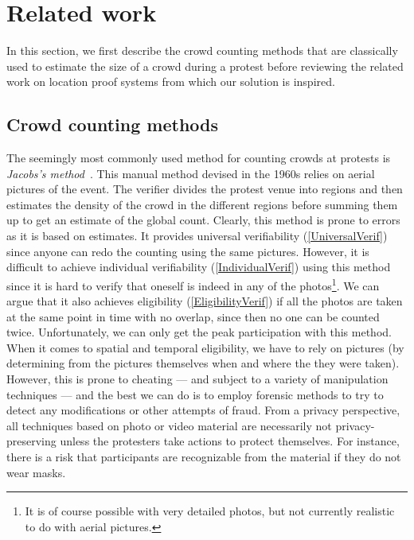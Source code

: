 \section{Related work}%
\label{RelatedWork}

In this section, we first describe the crowd counting methods that are classically used to estimate the size of a crowd during a protest before reviewing the related work on location proof systems from which our solution \PRIVO is inspired.  

\subsection{Crowd counting methods}

The seemingly most commonly used method for counting crowds at protests is \emph{Jacobs's method}~\cite{2016DemonstrationsInSeoul,BBCHowToCountProtestNumbers,HowWillWeKnowTrumpInauguralCrowdSize,TheXManMarch,TheCrowdNumbersGame}.
This manual method devised in the 1960s relies on aerial pictures of the event.
The verifier divides the protest venue into regions and then estimates the density of the crowd in the different regions before summing them up to get an estimate of the global count.
Clearly, this method is prone to errors as it is based on estimates.
It provides universal verifiability (\cref{UniversalVerif}) since anyone can redo the counting using the same pictures.
However, it is difficult to achieve individual verifiability (\cref{IndividualVerif}) using this method since it is hard to verify that oneself is indeed in any of the photos\footnote{It is of course possible with very detailed photos, but not currently realistic to do with aerial pictures.}.
We can argue that it also achieves eligibility (\cref{EligibilityVerif}) if all the photos are taken at the same point in time with no overlap, since then no one can be counted twice.
Unfortunately, we can only get the peak participation with this method.
When it comes to spatial and temporal eligibility, we have to rely on pictures (\eg by determining from the pictures themselves when and where the they were taken).
However, this is prone to cheating --- and subject to a variety of manipulation techniques --- and the best we can do is to employ forensic methods to try to detect any modifications or other attempts of fraud.
From a privacy perspective, all techniques based on photo or video material are necessarily not privacy-preserving unless the protesters take actions to protect themselves.
For instance, there is a risk that participants are recognizable from the material if they do not wear masks.


